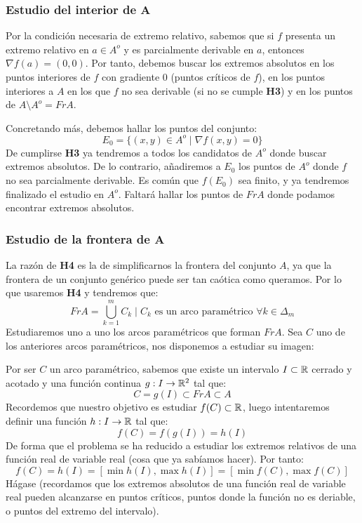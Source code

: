 \subsubsection{Estudio del interior de A}
\noindent
Por la condición necesaria de extremo relativo, sabemos que si $f$ presenta un extremo relativo en $a \in A^o$ y es parcialmente derivable en $a$, entonces $\nabla f(a)=(0,0)$. Por tanto, debemos buscar los extremos absolutos en los puntos interiores de $f$ con gradiente 0 (puntos críticos de $f$), en los puntos interiores a $A$ en los que $f$ no sea derivable (si no se cumple \textbf{H3}) y en los puntos de $A\setminus A^o = FrA$.
\vspace{.5cm}

\noindent
Concretando más, debemos hallar los puntos del conjunto:
$$E_0 = \{(x,y) \in A^o \mid \nabla f(x,y) = 0\}$$
De cumplirse \textbf{H3} ya tendremos a todos los candidatos de $A^o$ donde buscar extremos absolutos. De lo contrario, añadiremos a $E_0$ los puntos de $A^o$ donde $f$ no sea parcialmente derivable. Es común que $f(E_0)$ sea finito, y ya tendremos finalizado el estudio en $A^o$. Faltará hallar los puntos de $FrA$ donde podamos encontrar extremos absolutos.

\subsubsection{Estudio de la frontera de A}
\noindent
La razón de \textbf{H4} es la de simplificarnos la frontera del conjunto $A$, ya que la frontera de un conjunto genérico puede ser tan caótica como queramos. Por lo que usaremos \textbf{H4} y tendremos que:
$$FrA = \bigcup_{k=1}^m C_k \mid C_k \mbox{ es un arco paramétrico } \forall k \in \Delta_m$$
Estudiaremos uno a uno los arcos paramétricos que forman $FrA$. Sea $C$ uno de los anteriores arcos paramétricos, nos disponemos a estudiar su imagen:
\vspace{.5cm}

\noindent
Por ser $C$ un arco paramétrico, sabemos que existe un intervalo $I \subset \mathbb R$ cerrado y acotado y una función continua $g:I \rightarrow \mathbb R^2$ tal que:
$$C = g(I) \subset FrA \subset A$$
Recordemos que nuestro objetivo es estudiar $f(C) \subset \mathbb R$, luego intentaremos definir una función $h:I \rightarrow \mathbb R$ tal que:
$$f(C) = f(g(I)) = h(I)$$
De forma que el problema se ha reducido a estudiar los extremos relativos de una función real de variable real (cosa que ya sabíamos hacer). Por tanto:
$$f(C) = h(I) = [\min{h(I)}, \max{h(I)}] = [\min{f(C)}, \max{f(C)}]$$
Hágase (recordamos que los extremos absolutos de una función real de variable real pueden alcanzarse en puntos críticos, puntos donde la función no es deriable, o puntos del extremo del intervalo).

